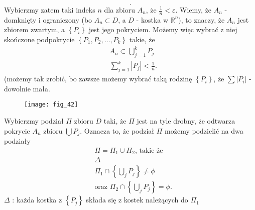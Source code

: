 \documentclass[../main.tex]{subfiles}
\begin{document}
\begin{dowod}
\[        .\] Wybierzmy zatem taki indeks $n$ dla zbioru $A_n$, że $\frac{1}{n} < \varepsilon$.
        Wiemy, że $A_n$ - domknięty i ograniczony (bo $A_n \subset D$, a $D$ - kostka w $\mathbb{R}^n$), to znaczy, że $A_n$ jest zbiorem zwartym, a $\left\{ P_i \right\} $ jest jego pokryciem.
        Możemy więc wybrać z niej skończone podpokrycie $\left\{ P_1, P_2, \ldots, P_k \right\} $ takie, że
        \begin{align*}
        &A_n \subset \bigcup_{j=1}^k P_j\\
        &\sum_{j=1}^{k} |P_j| < \frac{1}{n}
        .\end{align*}
        (możemy tak zrobić, bo zawsze możemy wybrać taką rodzinę $\left\{ P_i \right\} $, że $\sum |P_i|$ - dowolnie mała.
        \begin{figure}[h]
            \centering
            \texttt{[image: fig\_42]}
        \end{figure}
        Wybierzmy podział $\Pi$ zbioru $D$ taki, że $\Pi$ jest na tyle drobny, że odtwarza pokrycie $A_n$ zbioru $\bigcup P_j$. Oznacza to, że podział $\Pi$ możemy podzielić na dwa podziały
        \begin{align*}
            &\Pi = \Pi_1 \cup \Pi_2 \text{, takie że}\\
            &\Delta\\
            &\Pi_1 \cap \left\{ \bigcup_{j} P_j \right\} \neq \phi\\
            &\text{oraz } \Pi_2 \cap \left\{ \bigcup_{j} P_j \right\} = \phi
        .\end{align*}
        $\Delta$ : każda kostka z $\left\{ P_j \right\} $ składa się z kostek należących do $\Pi_1$


\end{dowod}
\end{document}

